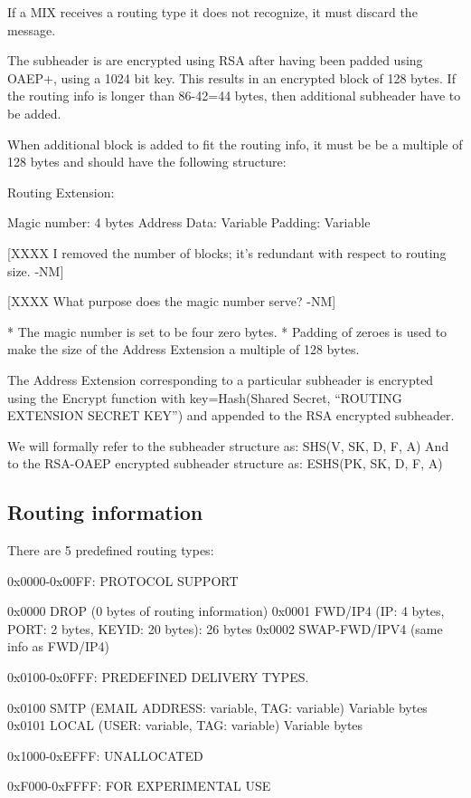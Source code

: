   If a MIX receives a routing type it does not recognize, it must
  discard the message. 

  The subheader is are encrypted using RSA after having been padded
  using OAEP+, using a 1024 bit key.  This results in an encrypted block
  of 128 bytes.  If the routing info is longer than 86-42=44 bytes, then
  additional subheader have to be added.

  When additional block is added to fit the routing info, it must be be a
  multiple of 128 bytes and should have the following structure:
 
  Routing Extension:

    Magic number:     4 bytes
    Address Data:     Variable
    Padding:          Variable

  [XXXX I removed the number of blocks; it's redundant with respect to
  routing size. -NM]

  [XXXX What purpose does the magic number serve? -NM]

* The magic number is set to be four zero bytes.
* Padding of zeroes is used to make the size of the Address Extension a
multiple of 128 bytes.  

The Address Extension corresponding to a particular subheader is
encrypted using the Encrypt function with key=Hash(Shared Secret,
``ROUTING EXTENSION SECRET KEY'') and appended to the RSA encrypted
subheader.

We will formally refer to the subheader structure as:
SHS(V, SK, D, F, A)
And to the RSA-OAEP encrypted subheader structure as:
ESHS(PK, SK, D, F, A)

\subsection{Routing information}

There are 5 predefined routing types:

0x0000-0x00FF: PROTOCOL SUPPORT

0x0000 DROP    (0 bytes of routing information)
0x0001 FWD/IP4 (IP: 4 bytes, PORT: 2 bytes, KEYID: 20 bytes): 26 bytes
0x0002 SWAP-FWD/IPV4 (same info as FWD/IP4)

0x0100-0x0FFF: PREDEFINED DELIVERY TYPES.

0x0100 SMTP   (EMAIL ADDRESS: variable, TAG: variable) Variable bytes
0x0101 LOCAL  (USER: variable, TAG: variable) Variable bytes

0x1000-0xEFFF: UNALLOCATED

0xF000-0xFFFF: FOR EXPERIMENTAL USE

